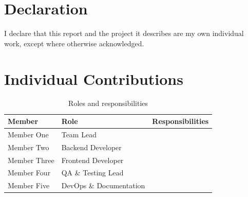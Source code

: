 %
\ifindividualproject

\section*{Declaration}

I declare that this report and the project it describes are my own individual
work, except where otherwise acknowledged.

\else

\section*{Individual Contributions}


\begin{table}[H]
\centering
\begin{tabular}{llp{5.5cm}}
\toprule
Member & Role & Responsibilities \\
\midrule
Member One & Team Lead & \\
Member Two & Backend Developer & \\
Member Three & Frontend Developer & \\
Member Four & QA \& Testing Lead & \\
Member Five & DevOps \& Documentation & \\
\bottomrule
\end{tabular}
\caption{Roles and responsibilities}\label{tab:Contributions}
\end{table}

